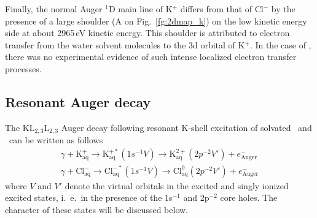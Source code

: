 
Finally, the normal Auger $^1$D main line of K$^{+}$ differs from that of Cl$^{-}$ by the presence of a large shoulder (A on Fig.\ \ref{fg:2dmap_k}) on the low kinetic energy side at about 2965\,eV kinetic energy. This shoulder is attributed to electron transfer from the water solvent molecules \citep{ceolin17:263003} to the 3d orbital of K$^{+}$. In the case of \cli, there was no experimental evidence of such intense localized electron transfer processes.


\subsection{Resonant Auger decay} \label{ssec:ra}


The KL$_{2,3}$L$_{2,3}$ Auger decay following resonant K-shell excitation of solvated \ki~and \cli~can be written as follows
%
\begin{align*}
\gamma + \text{K}^{+}_{\text{aq}} \rightarrow \text{K}^{+*}_{\text{aq}} (1s^{-1}V) \rightarrow \text{K}^{2+}_{\text{aq}} (2p^{-2}V') + e^{-}_{\text{Auger}}\\
\gamma + \text{Cl}^{-}_{\text{aq}} \rightarrow \text{Cl}^{-*}_{\text{aq}} (1s^{-1}V) \rightarrow \text{Cl}^{0}_{\text{aq}}(2p^{-2}V') + e^{-}_{\text{Auger}}
\end{align*}
%
where $V$ and $V'$ denote the virtual orbitals in the excited and singly ionized excited states, i.\ e.\ in the presence of the 1s$^{-1}$ and 2p$^{-2}$ core holes. The character of these states will be discussed below.


